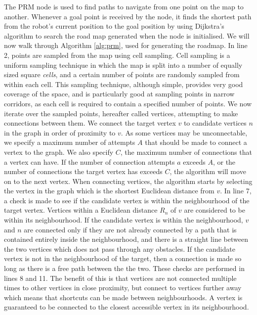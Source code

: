 \documentclass[conference]{IEEEtran}
\begin{document}
The PRM node is used to find paths to navigate from one point on the map to another. Whenever a goal point is received by the node, it finds the shortest path from the robot's current position to the goal position by using Dijkstra's algorithm to search the road map generated when the node is initialised. We will now walk through Algorithm \ref{alg:prm}, used for generating the roadmap. In line 2, points are sampled from the map using cell sampling. Cell sampling is a uniform sampling technique in which the map is split into a number of equally sized square \emph{cells}, and a certain number of points are randomly sampled from within each cell. This sampling technique, although simple, provides very good coverage of the space, and is particularly good at sampling points in narrow corridors, as each cell is required to contain a specified number of points. We now iterate over the sampled points, hereafter called vertices, attempting to make connections between them. We connect the target vertex $v$ to candidate vertices $n$ in the graph in order of proximity to $v$. As some vertices may be unconnectable, we specify a maximum number of attempts $A$ that should be made to connect a vertex to the graph. We also specify $C$, the maximum number of connections that a vertex can have. If the number of connection attempts $a$ exceeds $A$, or the number of connections the target vertex has exceeds $C$, the algorithm will move on to the next vertex. When connecting vertices, the algorithm starts by selecting the vertex in the graph which is the shortest Euclidean distance from $v$. In line 7, a check is made to see if the candidate vertex is within the neighbourhood of the target vertex. Vertices within a Euclidean distance $R_n$ of $v$ are considered to be within its neighbourhood. If the candidate vertex is within the neighbourhood, $v$ and $n$ are connected only if they are not already connected by a path that is contained entirely inside the neighbourhood, and there is a straight line between the two vertices which does not pass through any obstacles. If the candidate vertex is not in the neighbourhood of the target, then a connection is made so long as there is a free path between the the two. These checks are performed in lines 8 and 11. The benefit of this is that vertices are not connected multiple times to other vertices in close proximity, but connect to vertices further away which means that shortcuts can be made between neighbourhoods. A vertex is guaranteed to be connected to the closest accessible vertex in its neighbourhood.
\end{document}
